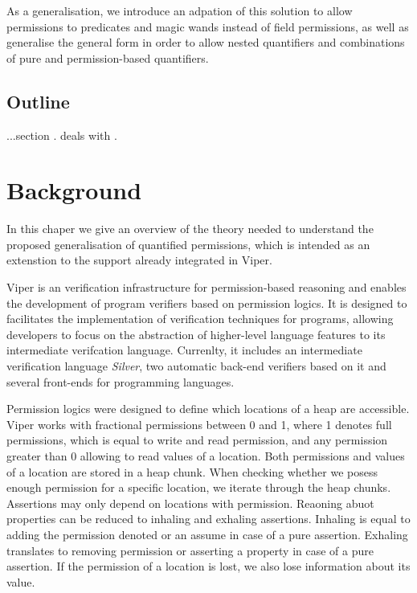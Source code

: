 \documentclass[12pt]{article}
\begin{document}
As a generalisation, we introduce an adpation of this solution to allow permissions to predicates\cite{predicates} and magic wands\cite{magicwand} instead of field permissions, as well as generalise the general form in order to allow nested quantifiers and combinations of pure and permission-based quantifiers.

\subsection{Outline}

...section . deals with .

\section{Background}
In this chaper we give an overview of the theory needed to understand the proposed generalisation of quantified permissions, which is intended as an extenstion to the support already integrated in Viper\cite{viper}.

Viper is an verification infrastructure for permission-based reasoning and enables the development of program verifiers based on permission logics. It is designed to facilitates the implementation of verification techniques for programs, allowing developers to focus on the abstraction of higher-level language features to its intermediate verifcation language. Currenlty, it includes an intermediate verification language \textit{Silver}, two automatic back-end verifiers based on it and several front-ends for programming languages.

Permission logics were designed to define which locations of a heap are accessible. Viper works with fractional permissions between 0 and 1, where 1 denotes full permissions, which is equal to write and read permission, and any permission greater than 0 allowing to read values of a location. Both permissions and values of a location are stored in a heap chunk. When checking whether we posess enough permission for a specific location, we iterate through the heap chunks.
Assertions may only depend on locations with permission. Reaoning abuot properties can be reduced to inhaling and exhaling assertions. Inhaling is equal to adding the permission denoted or an assume in case of a pure assertion. Exhaling translates to removing permission or asserting a property in case of a pure assertion. If the permission of a location is lost, we also lose information about its value.
\end{document}
